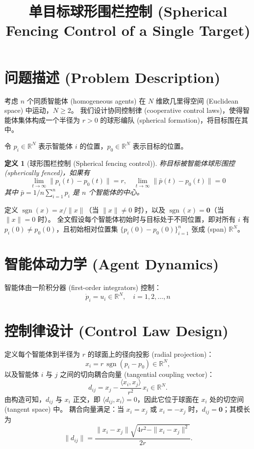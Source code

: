 \documentclass{ctexart}
\title{单目标球形围栏控制 (Spherical Fencing Control of a Single Target)}
\DeclareMathOperator{\sgn}{sgn}
\newtheorem{definition}[theorem]{定义}
\begin{document}
\maketitle

\section{问题描述 (Problem Description)}

考虑 $n$ 个同质智能体 (homogeneous agents) 在 $N$ 维欧几里得空间 (Euclidean space) 中运动，$N \geq 2$。
我们设计协同控制律 (cooperative control laws)，使得智能体集体构成一个半径为 $r > 0$ 的球形编队 (spherical formation)，将目标围在其中。

令 $p_i \in \mathbb{R}^N$ 表示智能体 $i$ 的位置，$p_0 \in \mathbb{R}^N$ 表示目标的位置。
\begin{definition}[球形围栏控制 (Spherical fencing control)]
称目标被智能体\textit{球形围控 (spherically fenced)}，如果有
\begin{equation}
\lim_{t \to \infty} \|p_i(t) - p_0(t)\| = r ,
\quad 
\lim_{t \to \infty} \|\bar{p}(t) - p_0(t)\| = 0
\end{equation}
其中 $\bar{p}=1/n \sum_{i=1}^{n} p_i$ 是 $n$ 个智能体的中心。
\end{definition}

定义 $\sgn(x) = x/\|x\|$（当 $\|x\| \neq 0$ 时），以及 $\sgn(x) = \mathbf{0}$（当 $\|x\| = 0$ 时）。
全文假设每个智能体初始时与目标处于不同位置，即对所有 $i$ 有 $p_i(0) \neq p_0(0)$，且初始相对位置集 $\{p_i(0) - p_0(0)\}_{i=1}^{n}$ 张成 (span) $\mathbb{R}^N$。

\section{智能体动力学 (Agent Dynamics)}

智能体由一阶积分器 (first-order integrators) 控制：
\begin{equation}
\dot{p}_i = u_i \in \mathbb{R}^N, \quad i = 1,2,\dots,n
\label{eq:agent_dyn}
\end{equation}

\section{控制律设计 (Control Law Design)}

定义每个智能体到半径为 $r$ 的球面上的径向投影 (radial projection)：
\begin{equation}
    x_i = r\,\sgn(p_i - p_0) \in \mathbb{R}^N,
\end{equation}
以及智能体 $i$ 与 $j$ 之间的切向耦合向量 (tangential coupling vector)：
\begin{equation}
    d_{ij} = x_j - \frac{\langle x_i, x_j \rangle}{r^2}\, x_i \in \mathbb{R}^N.
\end{equation}
由构造可知，$d_{ij}$ 与 $x_i$ 正交，即 $\langle d_{ij}, x_i \rangle = 0$，因此它位于球面在 $x_i$ 处的切空间 (tangent space) 中。
耦合向量满足：当 $x_i = x_j$ 或 $x_i = -x_j$ 时，$d_{ij} = \mathbf{0}$；其模长为
\begin{equation}
\|d_{ij}\| = \frac{\|x_i - x_j\| \sqrt{4r^2 - \|x_i - x_j\|^2}}{2r}.
\end{equation}
\end{document}
